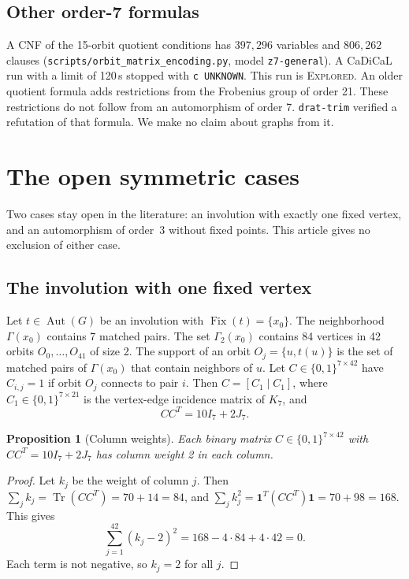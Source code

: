 \documentclass{article}
\theoremstyle{plain}
\newtheorem{proposition}[theorem]{Proposition}
\theoremstyle{definition}
\DeclareMathOperator{\Aut}{Aut}
\DeclareMathOperator{\Fix}{Fix}
\DeclareMathOperator{\Tr}{Tr}
\numberwithin{equation}{section}
\begin{document}
\subsection{Other order-7 formulas}

A CNF of the 15-orbit quotient conditions has $397{,}296$ variables and $806{,}262$ clauses (\texttt{scripts/orbit\_matrix\_encoding.py}, model \texttt{z7-general}). A CaDiCaL run with a limit of 120\,s stopped with \texttt{c UNKNOWN}. This run is \textsc{Explored}.
An older quotient formula adds restrictions from the Frobenius group of order 21. These restrictions do not follow from an automorphism of order 7. \texttt{drat-trim} verified a refutation of that formula. We make no claim about graphs from it.

\section{The open symmetric cases}
\label{sec:open}

Two cases stay open in the literature: an involution with exactly one fixed vertex, and an automorphism of order~3 without fixed points. This article gives no exclusion of either case.

\subsection{The involution with one fixed vertex}

Let $t \in \Aut(G)$ be an involution with $\Fix(t) = \{x_0\}$. The neighborhood $\Gamma(x_0)$ contains 7 matched pairs. The set $\Gamma_2(x_0)$ contains 84 vertices in 42 orbits $O_0, \dots, O_{41}$ of size 2.
The support of an orbit $O_j = \{u, t(u)\}$ is the set of matched pairs of $\Gamma(x_0)$ that contain neighbors of $u$.
Let $C \in \{0, 1\}^{7 \times 42}$ have $C_{i,j} = 1$ if orbit $O_j$ connects to pair $i$.
Then $C = [C_1 \mid C_1]$, where $C_1 \in \{0,1\}^{7 \times 21}$ is the vertex-edge incidence matrix of $K_7$, and
\begin{equation}
 C C^T = 10 I_7 + 2 J_7.
 \label{eq:cct}
\end{equation}

\begin{proposition}[Column weights]
Each binary matrix $C \in \{0, 1\}^{7 \times 42}$ with $C C^T = 10 I_7 + 2 J_7$ has column weight 2 in each column.
\end{proposition}
\begin{proof}
Let $k_j$ be the weight of column $j$. Then $\sum_j k_j = \Tr(C C^T) = 70 + 14 = 84$, and $\sum_j k_j^2 = \mathbf{1}^T (C C^T) \mathbf{1} = 70 + 98 = 168$. This gives
\begin{equation}
 \sum_{j=1}^{42} (k_j - 2)^2 = 168 - 4 \cdot 84 + 4 \cdot 42 = 0.
\end{equation}
Each term is not negative, so $k_j = 2$ for all $j$.
\end{proof}
\end{document}
